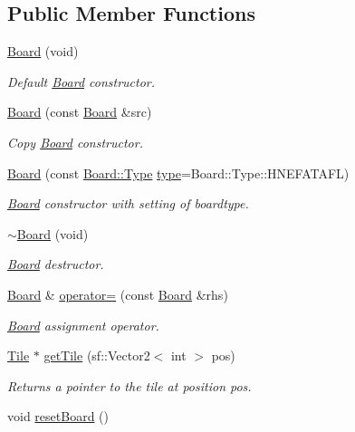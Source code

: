\subsection*{Public Member Functions}
\begin{DoxyCompactItemize}
\item 
\hyperlink{class_board_a469583fc5c99cd2aa4c6b6bd1250743b}{Board} (void)
\begin{DoxyCompactList}\small\item\em Default \hyperlink{class_board}{Board} constructor. \end{DoxyCompactList}\item 
\hypertarget{class_board_a0830880c4f04fa4500e23d67dfec525d}{\hyperlink{class_board_a0830880c4f04fa4500e23d67dfec525d}{Board} (const \hyperlink{class_board}{Board} \&src)}\label{class_board_a0830880c4f04fa4500e23d67dfec525d}

\begin{DoxyCompactList}\small\item\em Copy \hyperlink{class_board}{Board} constructor. \end{DoxyCompactList}\item 
\hyperlink{class_board_af67811d3be762bf75ebe5b2dc4b3070e}{Board} (const \hyperlink{class_board_a7a90fdd0f301fc502684108416605644}{Board\-::\-Type} \hyperlink{class_board_a05a3dd8f1f000e20e743e894163228ec}{type}=Board\-::\-Type\-::\-H\-N\-E\-F\-A\-T\-A\-F\-L)
\begin{DoxyCompactList}\small\item\em \hyperlink{class_board}{Board} constructor with setting of boardtype. \end{DoxyCompactList}\item 
\hypertarget{class_board_a737c0ecdabeccd0460bcbae2f8ac6c44}{\hyperlink{class_board_a737c0ecdabeccd0460bcbae2f8ac6c44}{$\sim$\-Board} (void)}\label{class_board_a737c0ecdabeccd0460bcbae2f8ac6c44}

\begin{DoxyCompactList}\small\item\em \hyperlink{class_board}{Board} destructor. \end{DoxyCompactList}\item 
\hyperlink{class_board}{Board} \& \hyperlink{class_board_a57a4317cebaae4f6879856262cf9caae}{operator=} (const \hyperlink{class_board}{Board} \&rhs)
\begin{DoxyCompactList}\small\item\em \hyperlink{class_board}{Board} assignment operator. \end{DoxyCompactList}\item 
\hyperlink{class_tile}{Tile} $\ast$ \hyperlink{class_board_a4dd030ffcb9abc165ace3734e34dd26f}{get\-Tile} (sf\-::\-Vector2$<$ int $>$ pos)
\begin{DoxyCompactList}\small\item\em Returns a pointer to the tile at position pos. \end{DoxyCompactList}\item 
\hypertarget{class_board_a7cef7a9ca499d64c71cb170d67f76ad0}{void \hyperlink{class_board_a7cef7a9ca499d64c71cb170d67f76ad0}{reset\-Board} ()}\label{class_board_a7cef7a9ca499d64c71cb170d67f76ad0}


\end{DoxyCompactItemize}
